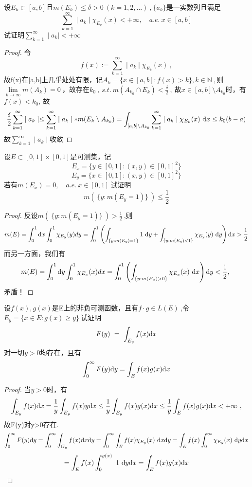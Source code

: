 设$E_k \subset[a,b]$且$m(E_k)\leq \delta >0\ (k=1,2,...)\ $,$\ \{a_k\}$是一实数列且满足$$\sum_{k=1}^{\infty}\mid a_k\mid \chi_{E_k}(x)<+\infty,\quad a.e.\ x\in [a,b]$$试证明$\sum\limits_{k=1}^{\infty}\mid a_k\mid <+\infty$
\begin{proof}
	令$$f(x):=\sum_{k=1}^{\infty}\mid a_k\mid \chi_{E_k}(x)\ , $$故f(x)在[a,b]上几乎处处有限，记$A_k=\{x\in[a,b]:f(x)>k\},k \in \mathbb{N}\ ,$则$\lim\limits_{k\to\infty}m(A_k)=0\ ，$故存在$k_0\ ,\ s.t.\ m(A_{k_0}\cap E_k)<\frac{\delta}{2}\ ,\ $故$x\in [a,b]\setminus A_{k_0}$时，有$f(x)<k_0,\ $故$$\frac{\delta}{2}\sum_{k=1}^{\infty}\mid a_k\mid \leq \sum_{k=1}^{\infty}\mid a_k\mid *m(E_k\setminus A_{k_0})=\int_{[a,b]\setminus A_{k_0}} \sum_{k=1}^{\infty}\mid a_k\mid\chi_{E_k}(x)\ \mathrm{d}x\leq k_0(b-a)$$
	故$\sum_{k=1}^{\infty}\mid a_k\mid$收敛
\end{proof}


设$E\subset[0,1]\times[0,1]$是可测集，记$$E_x=\{y\in [0,1]:(x,y)\in [0,1]^2\}$$$$E_y=\{x\in [0,1]:(x,y)\in [0,1]^2\}$$若有$m(E_x)=0,\quad a.e.\ x\in [0,1]\ $试证明$$m(\ \{y:m(E_y=1) \}\ )\leq \frac{1}{2}$$
\begin{proof}
	反设$m(\ \{y:m(E_y=1) \}\ )>\frac{1}{2}\ $,则$$m(E)=\int_{0}^{1}\di{x}\int_{0}^{1}\chi_{E_y}(y)dy = \int_{0}^{1}\left(\int_{\{y:m(E_y)=1\}}1\ \di{y}+\int_{\{y:m(E_y)<1\}}\chi_{E_y}(y)\ \di{y}\right)\di{x}>\frac{1}{2}$$
	而另一方面，我们有$$m(E)=\int_{0}^{1}\di{y}\int_{0}^{1}\chi_{E_x}(x)dx = \int_{0}^{1}\left(\int_{\{y:m(E_x)>0\}}\chi_{E_x}(x)\ \di{x}\right)\di{y}<\frac{1}{2},\ $$矛盾！
\end{proof}


设$f(x),g(x)$是E上的非负可测函数，且有$f·g\in L(E)\ $,令$E_y=\{x\in E:g(x)\geq y\}\ $试证明$$F(y)\ =\ \int_{E_y}f(x) \mathrm{d}x $$对一切$y>0$均存在，且有$$\int_{0}^{\infty}F(y)\mathrm{d}y=\int_E f(x)g(x)\mathrm{d}x$$
\begin{proof}
	当$y>0$时，有$$\int_{E_y}f(x)\di{x}=\frac{1}{y}\int_{E_y}f(x)y\di{x}\leq\frac{1}{y}\int_{E_y}f(x)g(x)\di{x}\leq\frac{1}{y}\int_{E}f(x)g(x)\di{x}<+\infty\ ,$$故F(y)对y>0存在.
	$$\int_{0}^{\infty}F(y)\di{y}=\int_{0}^{\infty}\int_{G_y}f(x)\di{x}\di{y}=\int_{0}^{\infty}\int_{E}f(x)\chi_{E_y}(x)\ \di{x}\di{y}=\int_{E}f(x)\int_{0}^{\infty}\chi_{E_y}(x)\ \di{y}\di{x}$$$$=\int_{E}f(x)\int_{0}^{g(x)}\ 1\ \di{y}\di{x}=\int_Ef(x)g(x)\di{x}$$
\end{proof}



